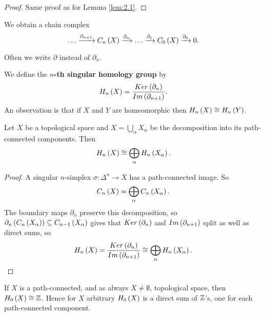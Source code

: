 \begin{proof}
Same proof as for Lemma \ref{lem:2.1}.
\end{proof}

We obtain a chain complex
$$ \dots \xrightarrow{\partial_{n + 1}} C_n\left( X \right) \xrightarrow{\partial_n} \dots \xrightarrow{\partial_1} C_0\left( X \right) \xrightarrow{\partial_0} 0. $$

\begin{remark*}
Often we write $ \partial $ instead of $ \partial_n $.
\end{remark*}

We define the \textbf{$ n $-th singular homology group} by
$$ H_n\left( X \right) = \dfrac{Ker\left( \partial_n \right)}{Im\left( \partial_{n + 1} \right)}. $$
An observation is that if $ X $ and $ Y $ are homeomorphic then $ H_n\left( X \right) \cong H_n\left( Y \right) $.

\begin{proposition}
\label{prop:2.6}
Let $ X $ be a topological space and $ X = \bigcup_\alpha X_\alpha $ be the decomposition into its path-connected components. Then
$$ H_n\left( X \right) \cong \bigoplus_\alpha H_n\left( X_\alpha \right). $$
\end{proposition}

\begin{proof}
A singular $ n $-simplex $ \sigma : \Delta^n \to X $ has a path-connected image. So
$$ C_n\left( X \right) = \bigoplus_\alpha C_n\left( X_\alpha \right). $$
The boundary maps $ \partial_n $ preserve this decomposition, so $ \partial_n\left( C_n\left( X_\alpha \right) \right) \subseteq C_{n - 1}\left( X_\alpha \right) $ gives that $ Ker\left( \partial_n \right) $ and $ Im\left( \partial_{n + 1} \right) $ split as well as direct sums, so
$$ H_n\left( X \right) = \dfrac{Ker\left( \partial_n \right)}{Im\left( \partial_{n + 1} \right)} \cong \bigoplus_\alpha H_n\left( X_\alpha \right). $$
\end{proof}

\begin{proposition}
\label{prop:2.7}
If $ X $ is a path-connected, and as always $ X \ne \emptyset $, topological space, then $ H_0\left( X \right) \cong \mathbb{Z} $. Hence for $ X $ arbitrary $ H_0\left( X \right) $ is a direct sum of $ \mathbb{Z} $'s, one for each path-connected component.
\end{proposition}

